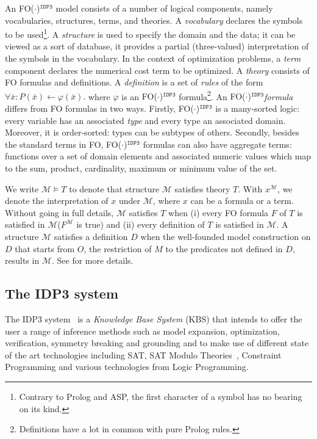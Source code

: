 \documentclass{tlp}
\newcommand{\idpdrie}{{\sc IDP3}\xspace}
\newcommand{\fodotidp}{{\sc FO($\cdot$)$^{\mathtt{IDP3}}$}\xspace}
\newcommand{\theory}{\ensuremath{T}\xspace}
\renewcommand{\|}{\ensuremath{\,|\,}}
\newcommand{\model}{\ensuremath{\mathcal{M}}\xspace}
\renewcommand{\|}{\,|\,}
\begin{document}
An \fodotidp model consists of a number of logical components, namely
vocabularies, structures, terms, and theories. A {\em vocabulary}
declares the symbols to be used\footnote{Contrary to Prolog and ASP,
  the first character of a symbol has no bearing on its kind.}. A {\em
  structure} is used to specify the domain and the data; it can be viewed as a sort of database,  it provides a partial
(three-valued) interpretation of the symbols in the vocabulary. 
In the context of optimization problems, a {\em term} component declares
the numerical cost term to be optimized.
 A {\em theory} consists of FO formulas and definitions.
%
A {\em  definition} is a set of {\em rules} of the form
$\forall \bar x: P(\bar x) \leftarrow \varphi(\bar x).$
where $\varphi$ is an \fodotidp formula\footnote{Definitions have a
  lot in common with pure Prolog rules.}.
%
%
An \fodotidp \emph{formula} differs from FO formulas in two ways.
Firstly, \fodotidp is a many-sorted logic: every variable has an
associated {\em type} and every type an associated domain.  Moreover,
it is order-sorted: types can be subtypes of others.  Secondly,
besides the standard terms in FO, \fodotidp formulas can also have
aggregate terms: functions over a set of domain elements and
associated numeric values which map to the sum, product, cardinality,
maximum or minimum value of the set.

We write $\model\models\theory$ to denote that structure \model
satisfies theory \theory. With $x^\model$, we denote the
interpretation of $x$ under $\model$, where $x$ can be a formula or a
term.
%
Without going in full details, \model satisfies \theory when (i) every
FO formula $F$ of \theory is satisfied in \model ($F^\model$ is true)
and (ii) every definition of \theory is satisfied in \model. A
structure \model satisfies a definition $D$ when the well-founded
model construction on $D$ \cite{GelderRS91} that starts from $O$, the
restriction of $M$ to the predicates not defined in $D$, results in
\model. See  for more details.



\subsection{The \idpdrie system}\label{sec:framework}

The \idpdrie system~\cite{inap/DePooterWD11} is a \emph{Knowledge Base
  System} (KBS) that intends to offer the user a range of inference
methods such as {model expansion}, {optimization}, {verification},
{symmetry breaking} and {grounding} and to make use of different state
of the art technologies including SAT, SAT Modulo
Theories~\cite{jacm/NieuwenhuisOT06}, Constraint Programming and
various technologies from Logic Programming.
\end{document}
